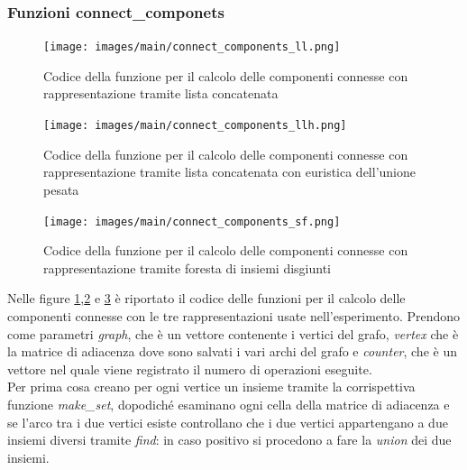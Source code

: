 \documentclass[12pt]{article}
\begin{document}
\subsubsection{Funzioni connect\_componets}
\begin{figure}[h]
    \centering
    \texttt{[image: images/main/connect\_components\_ll.png]}
    \caption{Codice della funzione per il calcolo delle componenti connesse con rappresentazione tramite lista concatenata}
    \label{fig:cc_ll}
\end{figure}
\begin{figure}[h]
    \centering
    \texttt{[image: images/main/connect\_components\_llh.png]}
    \caption{Codice della funzione per il calcolo delle componenti connesse con rappresentazione tramite lista concatenata con euristica dell'unione pesata}
    \label{fig:cc_llh}
\end{figure}
\begin{figure}[h]
    \centering
    \texttt{[image: images/main/connect\_components\_sf.png]}
    \caption{Codice della funzione per il calcolo delle componenti connesse con rappresentazione tramite foresta di insiemi disgiunti}
    \label{fig:cc_sf}
\end{figure}
Nelle figure \ref{fig:cc_ll},\ref{fig:cc_llh} e \ref{fig:cc_sf} è riportato il codice delle funzioni per il calcolo delle componenti connesse con le tre rappresentazioni usate nell'esperimento.
Prendono come parametri \textit{graph}, che è un vettore contenente i vertici del grafo, \textit{vertex} che è la matrice di adiacenza dove sono salvati i vari archi del grafo e \textit{counter}, che è un vettore nel quale viene registrato il numero di operazioni eseguite.\\
Per prima cosa creano per ogni vertice un insieme tramite la corrispettiva funzione \textit{make\_set}, dopodiché esaminano ogni cella della matrice di adiacenza e se l'arco tra i due vertici esiste controllano che i due vertici appartengano a due insiemi diversi tramite \textit{find}: in caso positivo si procedono a fare la \textit{union} dei due insiemi.
\end{document}
